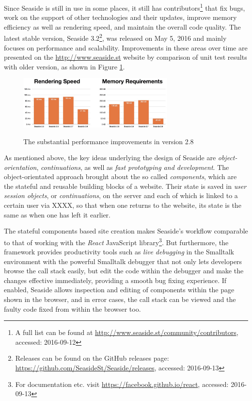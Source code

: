 \documentclass[a4paper,12pt,pagesize,headsepline,oribibl,titlepage]{scrartcl}
\begin{document}
Since Seaside is still in use in some places, it still has contributors\footnote{A full list can be found at \url{http://www.seaside.st/community/contributors}, accessed: 2016-09-12} that fix bugs, work on the support of other technologies and their updates, improve memory efficiency as well as rendering speed, and maintain the overall code quality. 
The latest stable version, Seaside 3.2\footnote{Releases can be found on the GitHub releases page: \url{https://github.com/SeasideSt/Seaside/releases}, accessed: 2016-09-13}, was released on May 5, 2016 and mainly focuses on performance and scalability. Improvements in these areas over time are presented on the \url{http://www.seaside.st} website by comparison of unit test results with older version, as shown in Figure \ref{fig:performance}.

\begin{figure}[hbp]
\begin{center}
\includegraphics*[width=0.7\textwidth]{images/performance.png}\\
\caption{The substantial performance improvements in version 2.8}
\label{fig:performance}
\end{center}
\end{figure}

As mentioned above, the key ideas underlying the design of Seaside are \emph{object-orientation}, \emph{continuations}, as well as \emph{fast prototyping and development}.
The object-orientated approach brought about the so called \emph{components}, which are the stateful and reusable building  blocks of a website. Their state is saved in \emph{user session objects}, or \emph{continuations}, on the server and each of which is linked to a certain user via XXXX, so that when one returns to the website, its state is the same as when one has left it earlier.

The stateful components based site creation makes Seaside's workflow comparable to that of working with the \emph{React} JavaScript library\footnote{For documentation etc. visit \url{https://facebook.github.io/react}, accessed: 2016-09-13}. But furthermore, the framework provides productivity tools such as \emph{live debugging} in the Smalltalk environment with the powerful Smalltalk debugger that not only lets developers browse the call stack easily, but edit the code within the debugger and make the changes effective immediately, providing a smooth bug fixing experience. If enabled, Seaside allows inspection and editing of components within the page shown in the browser, and in error cases, the call stack can be viewed and the faulty code fixed from within the browser too.
\end{document}
